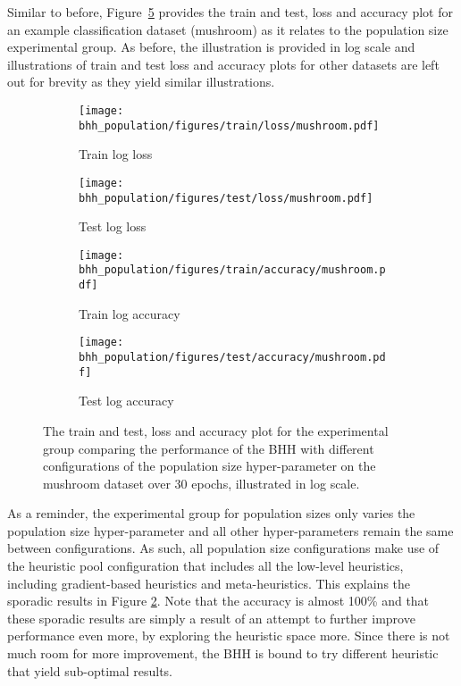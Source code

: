 Similar to before, Figure~\ref{fig:results:population:figures:mushroom} provides the train and test, loss and accuracy plot for an example classification dataset (mushroom) as it relates to the population size experimental group. As before, the illustration is provided in log scale and illustrations of train and test loss and accuracy plots for other datasets are left out for brevity as they yield similar illustrations.

\begin{figure}[H]
	\begin{subfigure}{0.5\textwidth}
		\centering
		\texttt{[image: bhh\_population/figures/train/loss/mushroom.pdf]}
		\caption{Train log loss}
		\label{fig:results:population:figures:loss:train:mushroom}
	\end{subfigure}
	\begin{subfigure}{0.5\textwidth}
		\centering
		\texttt{[image: bhh\_population/figures/test/loss/mushroom.pdf]}
		\caption{Test log loss}
		\label{fig:results:population:figures:loss:test:mushroom}
	\end{subfigure}
	\par\bigskip
	\begin{subfigure}{0.5\textwidth}
		\centering
		\texttt{[image: bhh\_population/figures/train/accuracy/mushroom.pdf]}
		\caption{Train log accuracy}
		\label{fig:results:population:figures:accuracy:train:mushroom}
	\end{subfigure}
	\begin{subfigure}{0.5\textwidth}
		\centering
		\texttt{[image: bhh\_population/figures/test/accuracy/mushroom.pdf]}
		\caption{Test log accuracy}
		\label{fig:results:population:figures:accuracy:test:mushroom}
	\end{subfigure}
	\par\bigskip
	\caption{The train and test, loss and accuracy plot for the experimental group comparing the performance of the \acs{BHH} with different configurations of the population size hyper-parameter on the mushroom dataset over 30 epochs, illustrated in log scale.}
	\label{fig:results:population:figures:mushroom}
\end{figure}

As a reminder, the experimental group for population sizes only varies the population size hyper-parameter and all other hyper-parameters remain the same between configurations. As such, all population size configurations make use of the heuristic pool configuration that includes all the low-level heuristics, including gradient-based heuristics and meta-heuristics. This explains the sporadic results in Figure \ref{fig:results:population:figures:loss:test:mushroom}. Note that the accuracy is almost 100\% and that these sporadic results are simply a result of an attempt to further improve performance even more, by exploring the heuristic space more. Since there is not much room for more improvement, the \acs{BHH} is bound to try different heuristic that yield sub-optimal results.

